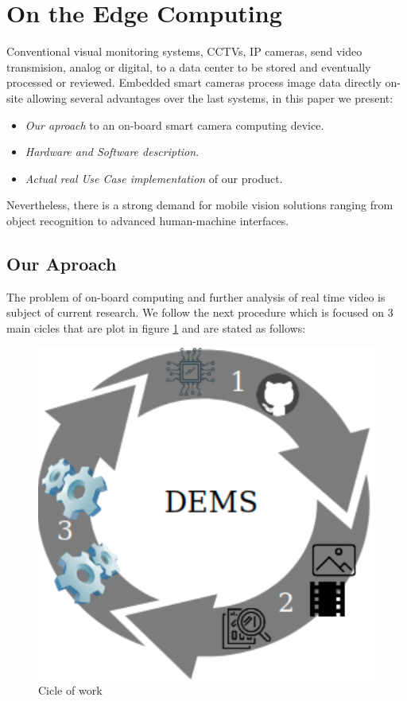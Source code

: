 \section{On the Edge Computing}

Conventional visual monitoring systems, CCTVs, IP cameras, send video transmision, analog or digital, to a data center to be stored and eventually processed or reviewed. Embedded smart cameras process image data directly on-site allowing several advantages over the last systems, in this paper we present:

\begin{itemize}[noitemsep] %
\item \textit{Our aproach} to an on-board smart camera computing device.
\item \textit{Hardware and Software description}.
\item \textit{Actual real Use Case implementation} of our product. 
\end{itemize}


Nevertheless, there is a strong demand for mobile vision solutions ranging from object recognition to advanced human-machine interfaces.

\subsection{Our Aproach}

The problem of on-board computing and further analysis of real time video is subject of current research. We follow the next procedure which is focused on 3 main cicles that are plot in figure \ref{fig:cicle} and are stated as follows:

\begin{figure}[h]\centering
	\includegraphics[width=0.7\linewidth]{images/cicle}
	\caption{Cicle of work}
	\label{fig:cicle}
\end{figure}


